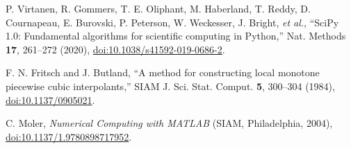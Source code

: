 P. Virtanen, R. Gommers, T. E. Oliphant, M. Haberland,
T. Reddy, D. Cournapeau, E. Burovski, P. Peterson,
W. Weckesser, J. Bright, \textit{et al.},
``SciPy 1.0: Fundamental algorithms for scientific computing in Python,''
Nat. Methods \textbf{17}, 261--272 (2020),
\href{https://doi.org/10.1038/s41592-019-0686-2}{doi:10.1038/s41592-019-0686-2}.

F. N. Fritsch and J. Butland,
``A method for constructing local monotone piecewise cubic interpolants,''
SIAM J. Sci. Stat. Comput. \textbf{5}, 300--304 (1984),
\href{https://doi.org/10.1137/0905021}{doi:10.1137/0905021}.

C. Moler,
\textit{Numerical Computing with MATLAB}
(SIAM, Philadelphia, 2004),
\href{https://doi.org/10.1137/1.9780898717952}{doi:10.1137/1.9780898717952}.
